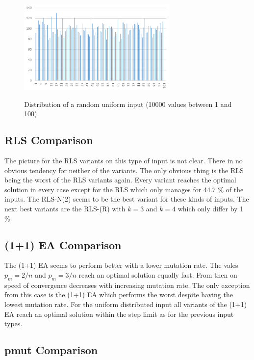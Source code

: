 \begin{figure}[h]
      \caption{Distribution of a random uniform input (10000 values between 1 and 100)}
      \centering
      \includegraphics[width=0.7\textwidth]{figures/images/numberGenerator/uniformDistributionMin1Max101n10000.png}\label{fig:uniDistExample}
\end{figure}
\subsection{RLS Comparison}




The picture for the RLS variants on this type of input is not clear.
There in no obvious tendency for neither of the variants.
The only obvious thing is the RLS being the worst of the RLS variants again.
Every variant reaches the optimal solution in every case except for the RLS which only manages for 44.7 \% of the inputs.
The RLS-N(2) seems to be the best variant for these kinds of inputs.
The next best variants are the RLS-(R) with $k=3$ and $k=4$ which only differ by 1 \%.

\subsection{(1+1) EA Comparison}




The (1+1) EA seems to perform better with a lower mutation rate.
The vales $p_m=2/n$ and $p_m=3/n$ reach an optimal solution equally fast.
From then on speed of convergence decreases with increasing mutation rate.
The only exception from this case is the (1+1) EA which performs the worst despite having the lowest mutation rate.
For the uniform distributed input all variants of the (1+1) EA reach an optimal solution within the step limit as for the previous input types.
\subsection{pmut Comparison}


